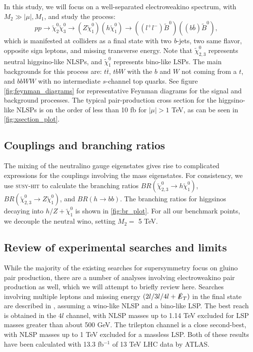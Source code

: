 In this study, we will focus on a well-separated electroweakino spectrum, with $M_2 \gg |\mu|,M_1$, and study the process:
\[pp\rightarrow \widetilde{\chi}_{2}^{0}\widetilde{\chi}_{3}^{0}\rightarrow (Z\widetilde{\chi}_1^{0})(h\widetilde{\chi}_1^{0})\rightarrow ((l^+l^-)\widetilde{B}^{0})((b\overline{b})\widetilde{B}^0),\]
which is manifested at colliders as a final state with two \emph{b}-jets, two same flavor, opposite sign leptons, and missing transverse energy. Note that $\widetilde{\chi}_{2,3}^0$ represents neutral higgsino-like NLSPs, and $\widetilde{\chi}_1^0$ represents bino-like LSPs. The main backgrounds for this process are: $t\overline{t}$, $tbW$ with the $b$ and $W$ not coming from a $t$, and $bbWW$ with no intermediate $s$-channel top quarks. See figure \ref{fig:feynman_diagrams} for representative Feynman diagrams for the signal and background processes. The typical pair-production cross section for the higgsino-like NLSPs is on the order of less than 10 fb for $|\mu|>1$ TeV, as can be seen in \autoref{fig:xsection_plot}.  

\subsection{Couplings and branching ratios}

The mixing of the neutralino gauge eigenstates gives rise to complicated expressions for the couplings involving the mass eigenstates. For consistency, we use \textsc{susy-hit} \cite{Djouadi:2006bz} to calculate the branching ratios $BR(\widetilde{\chi}_{2,3}^0\rightarrow h\widetilde{\chi}_1^0)$, $BR(\widetilde{\chi}_{2,3}^0\rightarrow Z\widetilde{\chi}_1^0)$, and $BR(h\rightarrow bb)$. The branching ratios for higgsinos decaying into $h/Z + \widetilde{\chi}_1^0$ is shown in \autoref{fig:br_plot}. For all our benchmark points, we decouple the neutral wino, setting $M_2 = $ 5 TeV.

\subsection{Review of experimental searches and limits}

While the majority of the existing searches for supersymmetry focus on gluino pair production, there are a number of analyses involving electroweakino pair production as well, which we will attempt to briefly review here. 
Searches involving multiple leptons and missing energy $(2l/3l/4l +\slashed{E}_T)$ in the final state are described in \citep{ATLAS:2016uwq,ATLAS:2016soo,Khachatryan:2014qwa,Chatrchyan:2012pka}, assuming a wino-like NLSP and a bino-like LSP. The best reach is obtained in the $4l$ channel, with NLSP masses up to 1.14 TeV excluded for LSP masses greater than about 500 GeV. The trilepton channel is a close second-best, with NLSP masses up to 1 TeV excluded for a massless LSP. Both of these results have been calculated with 13.3 fb$^{-1}$ of 13 TeV LHC data by ATLAS. 

